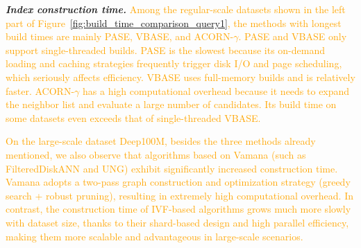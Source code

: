\documentclass[sigconf, nonacm]{acmart}
\begin{document}
{\textit{\textbf{Index construction time.}}
\textcolor{orange}{Among the regular-scale datasets shown in the left part of Figure~\ref{fig:build_time_comparison_query1}, the methods with longest build times are mainly PASE, VBASE, and ACORN-$\gamma$. PASE and VBASE only support single-threaded builds. PASE is the slowest because its on-demand loading and caching strategies frequently trigger disk I/O and page scheduling, which seriously affects efficiency. VBASE uses full-memory builds and is relatively faster. ACORN-$\gamma$  has a high computational overhead because it needs to expand the neighbor list and evaluate a large number of candidates. Its build time on some datasets even exceeds that of single-threaded VBASE. }

\textcolor{orange}{On the large-scale dataset Deep100M, besides the three methods already mentioned, we also observe that algorithms based on Vamana (such as FilteredDiskANN and UNG) exhibit significantly increased construction time. Vamana adopts a two-pass graph construction and optimization strategy (greedy search + robust pruning), resulting in extremely high computational overhead. In contrast, the construction time of IVF-based algorithms grows much more slowly with dataset size, thanks to their shard-based design and high parallel efficiency, making them more scalable and advantageous in large-scale scenarios.}


%
%
%


}
\end{document}
